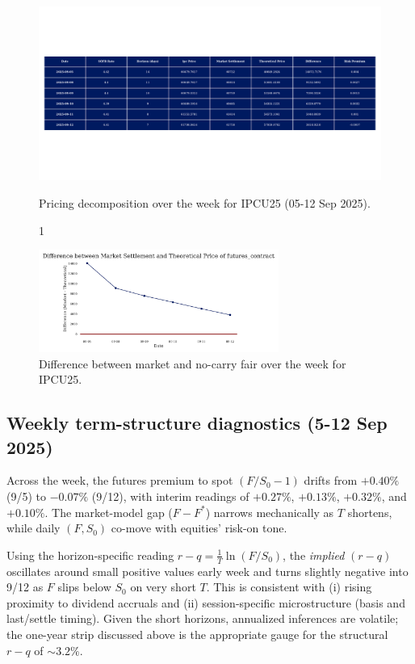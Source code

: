 \documentclass[11pt,a4paper]{article} %
\begin{document}
\begin{figure}[h]
  \centering
  \includegraphics[width=1\textwidth]{figures/ipc_pricing_over_the_week.pdf}
  \caption1{Pricing decomposition over the week for IPCU25 (05-12 Sep 2025).}
\end{figure}

\begin{figure}[h]
  \centering
  \includegraphics[width=0.7\textwidth]{figures/ipc_difference.pdf}
  \caption{Difference between market and no-carry fair over the week for IPCU25.}
\end{figure}

\subsection{Weekly term-structure diagnostics (5-12 Sep 2025)}

Across the week, the futures premium to spot \((F/S_0-1)\) drifts from \({+0.40\%}\) (9/5) to \({-0.07\%}\) (9/12), with interim readings of \(+0.27\%\), \(+0.13\%\), \(+0.32\%\), and \(+0.10\%\). The market-model gap (\(F-F^{*}\)) narrows mechanically as \(T\) shortens, while daily \((F,S_0)\) co-move with equities' risk-on tone.


Using the horizon-specific reading \(r-q=\frac{1}{T}\ln(F/S_0)\), the \emph{implied} \((r-q)\) oscillates around small positive values early week and turns slightly negative into 9/12 as \(F\) slips below \(S_0\) on very short \(T\). This is consistent with (i) rising proximity to dividend accruals and (ii) session-specific microstructure (basis and last/settle timing). Given the short horizons, annualized inferences are volatile; the one-year strip discussed above is the appropriate gauge for the structural \(r-q\) of \(\sim 3.2\%\).
\end{document}
